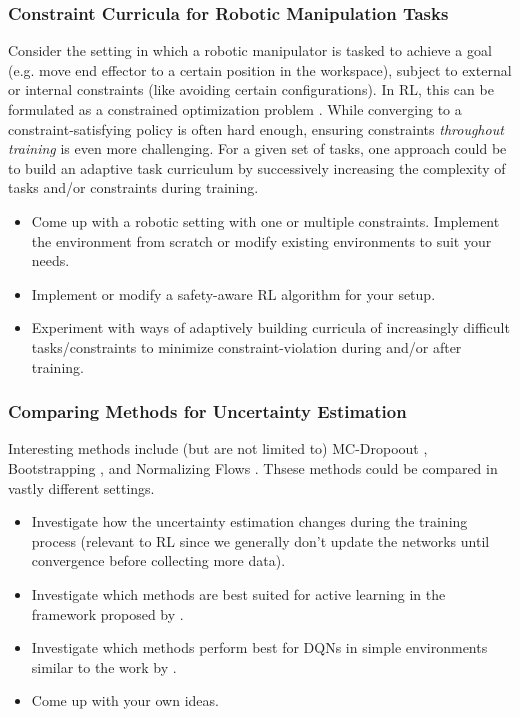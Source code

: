 \documentclass[a4paper]{article}
\begin{document}
\subsubsection{Constraint Curricula for Robotic Manipulation Tasks}
Consider the setting in which a robotic manipulator is tasked to achieve a goal (e.g. move end effector to a certain position in the workspace), subject to external or internal constraints (like avoiding certain configurations). In RL, this can be formulated as a constrained optimization problem \cite{Achiam2019BenchmarkingSE}. While converging to a constraint-satisfying policy is often hard enough, ensuring constraints \textit{throughout training} is even more challenging. For a given set of tasks, one approach could be to build an adaptive task curriculum by successively increasing the complexity of tasks and/or constraints during training.
\begin{itemize}
	\item Come up with a robotic setting with one or multiple constraints. Implement the environment from scratch or modify existing environments to suit your needs.
	\item Implement or modify a safety-aware RL algorithm for your setup.
	\item Experiment with ways of adaptively building curricula of increasingly difficult tasks/constraints to minimize constraint-violation during and/or after training.
\end{itemize}


\subsubsection{Comparing Methods for Uncertainty Estimation}
Interesting methods include (but are not limited to) MC-Dropoout \cite{Gal2016}, Bootstrapping \cite{Osband2018}, and Normalizing Flows \cite{louizos2017multiplicative}. Thsese methods could be compared in vastly different settings.
\begin{itemize}
  \item Investigate how the uncertainty estimation changes during the training process (relevant to RL since we generally don’t update the networks until convergence before collecting more data).
  \item Investigate which methods are best suited for active learning in the framework proposed by \cite{gal2017active}.
  \item Investigate which methods perform best for DQNs in simple environments similar to the work by \cite{touati2018randomized}.
  \item Come up with your own ideas.
\end{itemize}
\end{document}
